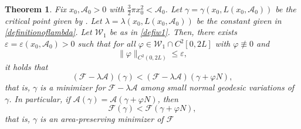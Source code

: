 \documentclass[11pt]{amsart}
\renewcommand{\leq}{\leqslant}
\newcommand{\A}{\mathcal A}
\newcommand{\cA}{\A}
\newcommand{\F}{\mathcal F}
\newcommand{\ga}{\gamma}
\newcommand{\cW}{\mathcal{W}_1}
\renewcommand{\phi}{\varphi}
\newtheorem{theorem}{Theorem}[section]
\theoremstyle{definition}
\theoremstyle{remark}
\numberwithin{equation}{section}
\begin{document}
\begin{theorem}\label{locminthm}
Fix  $x_0, \cA_0 > 0$ with $\frac{3}{2}\pi x_0^2<\cA_0 $. Let $\ga= \ga(x_0,L(x_0,\cA_0))$ be the critical point given by . Let $\lambda=\lambda(x_0,L(x_0,\cA_0))$ be the constant given in \eqref{definitionoflambda}. Let $\mathcal W_1$ be as in \eqref{defiw1}. Then, there exists $\varepsilon=\varepsilon(x_0,\A_0)>0$ such that for all $\phi \in \cW \cap C^2[0,2L]$ with $\phi\not\equiv 0$ and
\begin{equation*}
\| \phi \|_{C^{2}(0,2L)} \leq \varepsilon ,
\end{equation*}
it holds that
\begin{equation*}
(\mathcal F-\lambda  \A )(\gamma) < (\mathcal F-\lambda  \A )(\gamma + \phi N) , %
\end{equation*}
that is, $\gamma$ is a minimizer for $\F-\lambda\A$ among small normal geodesic variations of $\gamma$.
In particular, if $\cA(\gamma) = \cA(\gamma + \phi N)$, then
\begin{equation*}
\mathcal{F}(\gamma) < \mathcal{F}(\gamma + \phi N) ,
\end{equation*}
that is, $\gamma$ is an area-preserving minimizer of $\mathcal{F}$
\end{theorem}
\end{document}
